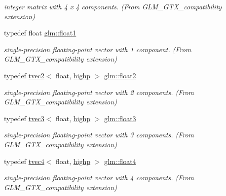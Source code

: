 \begin{DoxyCompactItemize}
\begin{DoxyCompactList}\small\item\em integer matrix with 4 x 4 components. (From G\+L\+M\+\_\+\+G\+T\+X\+\_\+compatibility extension) \end{DoxyCompactList}\item 
typedef float \mbox{\hyperlink{group__gtx__compatibility_gae0ad1b0450320cda98bbbecb56bc3167}{glm\+::float1}}
\begin{DoxyCompactList}\small\item\em single-\/precision floating-\/point vector with 1 component. (From G\+L\+M\+\_\+\+G\+T\+X\+\_\+compatibility extension) \end{DoxyCompactList}\item 
typedef \mbox{\hyperlink{structglm_1_1tvec2}{tvec2}}$<$ float, \mbox{\hyperlink{namespaceglm_a0f04f086094c747d227af4425893f545ac6f7eab42eacbb10d59a58e95e362074}{highp}} $>$ \mbox{\hyperlink{group__gtx__compatibility_ga3174e387d3b89c5dcff485c4e665a68c}{glm\+::float2}}
\begin{DoxyCompactList}\small\item\em single-\/precision floating-\/point vector with 2 components. (From G\+L\+M\+\_\+\+G\+T\+X\+\_\+compatibility extension) \end{DoxyCompactList}\item 
typedef \mbox{\hyperlink{structglm_1_1tvec3}{tvec3}}$<$ float, \mbox{\hyperlink{namespaceglm_a0f04f086094c747d227af4425893f545ac6f7eab42eacbb10d59a58e95e362074}{highp}} $>$ \mbox{\hyperlink{group__gtx__compatibility_ga25f20d2c12f9b5f3917467e92899ea5a}{glm\+::float3}}
\begin{DoxyCompactList}\small\item\em single-\/precision floating-\/point vector with 3 components. (From G\+L\+M\+\_\+\+G\+T\+X\+\_\+compatibility extension) \end{DoxyCompactList}\item 
typedef \mbox{\hyperlink{structglm_1_1tvec4}{tvec4}}$<$ float, \mbox{\hyperlink{namespaceglm_a0f04f086094c747d227af4425893f545ac6f7eab42eacbb10d59a58e95e362074}{highp}} $>$ \mbox{\hyperlink{group__gtx__compatibility_ga05e1940d91deb4bbe819881bf65dc52d}{glm\+::float4}}
\begin{DoxyCompactList}\small\item\em single-\/precision floating-\/point vector with 4 components. (From G\+L\+M\+\_\+\+G\+T\+X\+\_\+compatibility extension) \end{DoxyCompactList}\item 

\end{DoxyCompactItemize}
